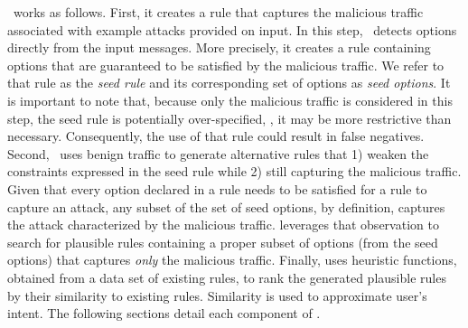 \documentclass[conference]{IEEEtran}
\begin{document}

\tname\ works as follows. First, it creates a rule that captures the
malicious traffic associated with example attacks provided on
input. In this step, \tname\ detects options directly from the input
messages. More precisely, it creates a rule containing options that
are guaranteed to be satisfied by the malicious traffic. We refer to
that rule as the \emph{seed rule} and its corresponding set of options
as \emph{seed options}. It is important to note that, because only the
malicious traffic is considered in this step, the seed rule is
potentially over-specified, \ie{}, it may be more restrictive than
necessary. Consequently, the use of that rule could result in false
negatives. Second, \tname\ uses benign traffic to generate alternative
rules that 1) weaken the constraints expressed in the seed rule while
2) still capturing the malicious traffic. Given that every option
declared in a rule needs to be satisfied for a rule to capture an
attack, any subset of the set of seed options, by definition, captures
the attack characterized by the malicious traffic. \tname{} leverages
that observation to search for plausible rules containing a proper
subset of options (from the seed options) that captures \emph{only} the
malicious traffic. Finally, \tname{} uses heuristic functions,
obtained from a data set of existing rules, to rank the generated
plausible rules by their similarity to existing rules. Similarity is
used to approximate user's intent. The following sections detail each
component of \tname.




\end{document}
